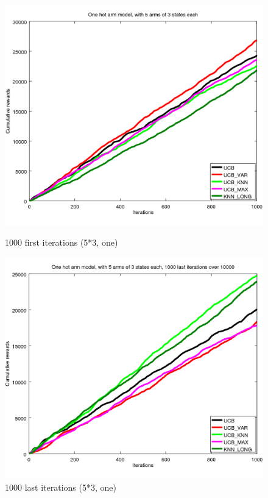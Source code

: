 \documentclass[french]{beamer}
\begin{document}
\begin{frame}
	\begin{figure}[h]
		\begin{minipage}[b]{.49\linewidth}
			\includegraphics[width=1.0\textwidth]{begin_s_1000it.png}
			\caption{1000 first iterations (5*3, one)}
		\end{minipage}
		\hfill
		\begin{minipage}[b]{0.49\linewidth}
			\includegraphics[width=1.0\textwidth]{last_s_1000it.png}
			\caption{1000 last iterations (5*3, one)}
		\end{minipage}
		\label{fig:f}
	\end{figure}
	

\end{frame}
\end{document}
